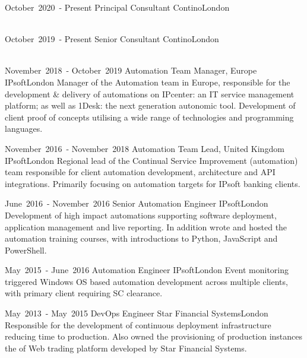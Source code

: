 
\cventry %
  {\mbox{October 2020 -} \mbox{Present}}
  {Principal Consultant}
  {Contino}{London}{}
  {
    \\~\\   
  }

\cventry %
  {\mbox{October 2019 -} \mbox{Present}}
  {Senior Consultant}
  {Contino}{London}{}
  {
    \\~\\   
  }

\cventry %
  {\mbox{November 2018 -} \mbox{October 2019}}
  {Automation Team Manager, Europe}
  {IPsoft}{London}{}
  {
    Manager of the Automation team in Europe, responsible for the 
    development \& delivery of automations on IPcenter: an IT service management 
    platform; as well as 1Desk: the next generation autonomic tool. 
    Development of client proof of concepts utilising a wide range of technologies and programming languages.\\
  }

\cventry %
  {\mbox{November 2016 -} \mbox{November 2018}}
  {Automation Team Lead, United Kingdom}
  {IPsoft}{London}{}
  {
    Regional lead of the Continual Service Improvement (automation) team responsible 
    for client automation development, architecture and API integrations. 
    Primarily focusing on automation targets for IPsoft banking clients.\\
  }

\cventry %
  {\mbox{June 2016 -} \mbox{November 2016}}
  {Senior Automation Engineer}
  {IPsoft}{London}{}
  {
    Development of high impact automations supporting software deployment, 
    application management and live reporting. In addition wrote and hosted 
    the automation training courses, with introductions to Python, JavaScript and PowerShell.\\
  }

\cventry %
  {\mbox{May 2015 -} \mbox{June 2016}}
  {Automation Engineer}
  {IPsoft}{London}{}
  {
    Event monitoring triggered Windows OS based automation development across 
    multiple clients, with primary client requiring SC clearance.\\
  }

\cventry %
  {\mbox{May 2013 -} \mbox{May 2015}}
  {DevOps Engineer}
  {Star Financial Systems}{London}{}
  {
    Responsible for the development of continuous deployment infrastructure 
    reducing time to production. Also owned the provisioning of production 
    instances the of Web trading platform developed by Star Financial Systems.\\
  }

